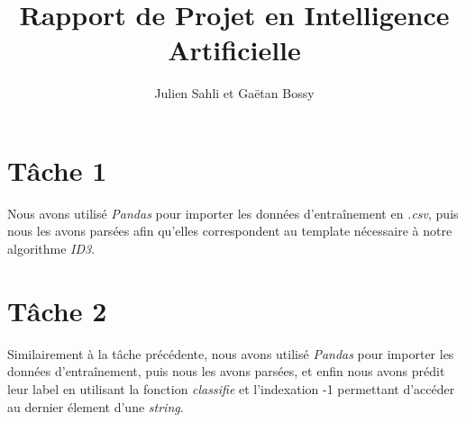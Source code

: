 \documentclass[a4paper,11pt,french]{article}
\title{Rapport de Projet en Intelligence Artificielle}
\author{Julien Sahli et Gaëtan Bossy}
\begin{document}
\maketitle
\section{Tâche 1}
Nous avons utilisé \emph{Pandas} pour importer les données d'entraînement en \emph{.csv}, puis nous les avons parsées afin qu'elles correspondent au template nécessaire à notre algorithme \emph{ID3}. %
\section{Tâche 2}
Similairement à la tâche précédente, nous avons utilisé \emph{Pandas} pour importer les données d'entraînement, puis nous les avons parsées, et enfin nous avons prédit leur label en utilisant la fonction \emph{classifie} et l'indexation -1 permettant d'accéder au dernier élement d'une \emph{string}.
\end{document}

